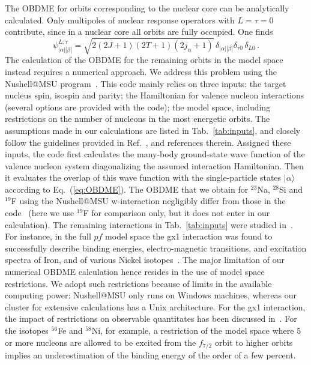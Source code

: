 \documentclass[11pt,a4paper]{article}
\begin{document}
The OBDME for orbits corresponding to the nuclear core can be analytically calculated. Only multipoles of nuclear response operators with $L=\tau=0$ contribute, since in a nuclear core all orbits are fully occupied. One finds~\cite{Walecka1}
\begin{equation}
\psi^{L;\tau}_{|\alpha| |\beta|}=\sqrt{2(2J+1)(2T+1)(2j_\alpha+1)}\, \delta_{|\alpha| |\beta|}\delta_{\tau0}\,\delta_{L0}\,.
\label{eq:core}
\end{equation}
The calculation of the OBDME for the remaining orbits in the model space instead requires a numerical approach.
We address this problem using the {\sffamily Nushell@MSU} program~\cite{NuShell,Brown:2001zz}. 
This code mainly relies on three inputs: the target nucleus spin, isospin and parity; the Hamiltonian for valence nucleon interactions (several options are provided with the code); the model space, including restrictions on the number of nucleons in the most energetic orbits. The assumptions made in our calculations are listed in Tab.~\ref{tab:inputs}, and closely follow the guidelines provided in Ref.~\cite{Brown:2001zz}, and references therein. Assigned these inputs, the code first calculates the many-body ground-state wave function of the valence nucleon system diagonalizing the assumed interaction Hamiltonian. Then it evaluates the overlap of this wave function with the single-particle states $|\alpha \rangle$ according to Eq.~(\ref{eq:OBDME}). 
The OBDME that we obtain for $^{23}$Na, $^{28}$Si and $^{19}$F using the {\sffamily Nushell@MSU} w-interaction negligibly differ from those in the code~\cite{Anand:2013yka} (here we use $^{19}$F for comparison only, but it does not enter in our calculation). The remaining interactions in Tab.~\ref{tab:inputs} were studied in~\cite{Warburton:1992rh,Nummela:2001xh,Honma:2004xk}. For instance, in the full $pf$ model space the gx1 interaction was found to successfully describe binding energies, electro-magnetic transitions, and excitation spectra of Iron, and of various Nickel isotopes~\cite{Honma:2004xk}. The major limitation of our numerical OBDME calculation hence resides in the use of model space restrictions. We adopt such restrictions because of limits in the available computing power: {\sffamily Nushell@MSU} only runs on Windows machines, whereas our cluster for extensive calculations has a Unix architecture. For the gx1 interaction, the impact of restrictions on observable quantitates has been discussed in~\cite{Honma:2004xk}. For the isotopes $^{56}$Fe and $^{58}$Ni, for example, a restriction of the model space where 5 or more nucleons are allowed to be excited from the $f_{7/2}$ orbit to higher orbits implies an underestimation of the binding energy of the order of a few percent. 
\end{document}
